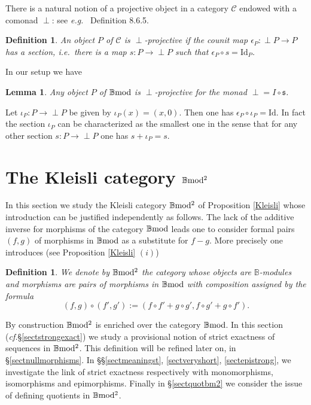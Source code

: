 \documentclass[12pt]{article}
\newtheorem{lem}[thm]{Lemma}
\newtheorem{defn}[thm]{Definition}
\def\id{{\rm id}}
\def\B{{\mathbb B}}
\def\strg{strict }
\def\cC{{\mathcal C}}
\newcommand{\ie}{{\it i.e.\/}\ }
\newcommand{\eg}{{\it e.g.\/}\ }
\newcommand{\cf}{{\it cf.}}
\def\id{{\mbox{Id}}}
\def\yb{\mathfrak{s}}
\def\bmod{{\rm \B mod}}
\def\bm2{{\rm \B mod^2}}
\begin{document}
There is a natural notion of a projective object in a category $\cC$ endowed with a comonad $\perp$: see \eg \cite{Weibel} Definition 8.6.5.
\begin{defn}\label{projective def} An object $P$ of $\cC$ is $\perp$-projective if the counit map $\epsilon_P:\perp\! P\to P$ has a section, \ie there is a map $s:P\to \perp\! P$ such that $\epsilon_P\circ s=\id_P$.	
\end{defn}
In our setup we have
\begin{lem}\label{projective sect} Any object $P$ of $\bmod$ is $\perp$-projective for the monad $\perp=I\circ \yb$.	
\end{lem}
\proof Let $\iota_P:P\to \perp\! P$ be given by $\iota_P(x)=(x,0)$. Then one has $\epsilon_P\circ \iota_P=\id$. In fact the section $\iota_P$ can be characterized as the smallest one in the sense that for any other section $s:P\to \perp\! P$  one has $s+\iota_P=s$. \endproof



\section{The Kleisli  category $\bm2$}\label{weak and strong}

In this section we study the Kleisli category $\bm2$ of Proposition \ref{Kleisli} whose introduction can be justified independently as follows. 
The lack of the additive inverse for morphisms of the category $\bmod$ leads one to consider formal pairs $(f,g)$ of morphisms in $\bmod$ as a substitute for $f-g$. More precisely one introduces (see Proposition \ref{Kleisli} $(i)$)

\begin{defn} We denote by $\bm2$ the category whose objects are  $\B$-modules and morphisms are pairs of morphisms in $\bmod$ with composition assigned by the formula
\begin{equation}\label{paircompbm2biis}
	(f,g)\circ (f',g'):=(f\circ f'+g\circ g', f\circ g'+g\circ f').
\end{equation}
\end{defn}
By construction $\bm2$ is enriched over the category $\bmod$. In this section (\cf \S \ref{sectstrongexact}) we study a provisional notion of \strg exactness of sequences in $\bm2$. This definition 
 will be refined later on, in \S\ref{sectnullmorphisms}. In \S\S\ref{sectmeaningst}, \ref{sectveryshort}, \ref{sectepistrong}, we investigate the link of \strg exactness respectively with monomorphisms,  isomorphisms  and  epimorphisms. Finally in \S \ref{sectquotbm2} we consider the issue of defining quotients in $\bm2$.
\end{document}
